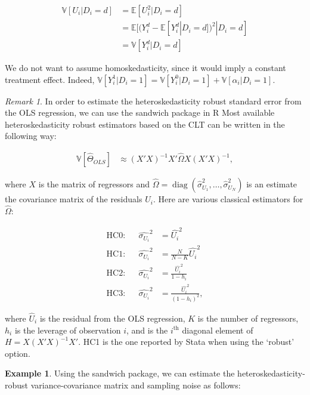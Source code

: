 \documentclass[
]{book}
\newcommand{\esp}[1]{\mathbb{E}[ #1 ]}
\newcommand{\var}[1]{\mathbb{V}[ #1 ]}
\DeclareMathOperator{\diag}{diag}
\theoremstyle{definition}
\theoremstyle{definition}
\newtheorem{example}{Example}[chapter]
\theoremstyle{definition}
\theoremstyle{definition}
\theoremstyle{remark}
\newtheorem*{remark}{Remark}
\begin{document}
\begin{align*}
    \var{U_i|D_i=d} & = \esp{U_i^2|D_i=d}  \\
                    & = \esp{(Y^d_i-\esp{Y^d_i|D_i=d})^2|D_i=d}  \\
                    & = \var{Y_i^d|D_i=d}
  \end{align*}

We do not want to assume homoskedasticity, since it would imply a constant treatment effect.
Indeed, \(\var{Y_i^1|D_i=1} = \var{Y_i^0|D_i=1}+\var{\alpha_i|D_i=1}\).

\begin{remark}
\iffalse{} {Remark. } \fi{}In order to estimate the heteroskedasticity robust standard error from the OLS regression, we can use the sandwich package in R
Most available heteroskedasticity robust estimators based on the CLT can be written in the following way:
\end{remark}

\begin{align*}
  \var{\hat{\Theta}_{OLS}} & \approx (X'X)^{-1}X'\hat{\Omega}X(X'X)^{-1},
\end{align*}

where \(X\) is the matrix of regressors and \(\hat{\Omega}=\diag(\hat{\sigma}^2_{U_1},\dots,\hat{\sigma}^2_{U_N})\) is an estimate the covariance matrix of the residuals \(U_i\).
Here are various classical estimators for \(\hat{\Omega}\):

\begin{align*}
  \text{HC0:} & & \hat{\sigma_{U_i}}^2 & = \hat{U_i}^2 \\
  \text{HC1:} & & \hat{\sigma_{U_i}}^2 & = \frac{N}{N-K}\hat{U_i}^2 \\
  \text{HC2:} & & \hat{\sigma_{U_i}}^2 & = \frac{\hat{U_i}^2}{1-h_i} \\
  \text{HC3:} & & \hat{\sigma_{U_i}}^2 & = \frac{\hat{U_i}^2}{(1-h_i)^2}, 
\end{align*}

where \(\hat{U}_i\) is the residual from the OLS regression, \(K\) is the number of regressors, \(h_i\) is the leverage of observation \(i\), and is the \(i^{\text{th}}\) diagonal element of \(H=X(X'X)^{-1}X'\).
HC1 is the one reported by Stata when using the `robust' option.

\begin{example}
\protect\hypertarget{exm:unnamed-chunk-54}{}{\label{exm:unnamed-chunk-54} }Using the sandwich package, we can estimate the heteroskedasticity-robust variance-covariance matrix and sampling noise as follows:
\end{example}
\end{document}
